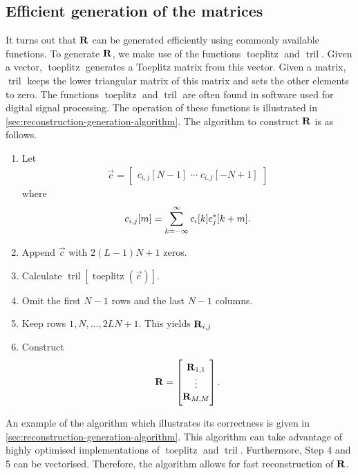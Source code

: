 \documentclass[a4paper, openany, oneside]{memoir}
\begin{document}
\subsection{Efficient generation of the matrices}
\label{sub:reconstruction-generation}
It turns out that $\boldsymbol{\mathbf{R}}$ can be generated efficiently using commonly available functions. To generate $\boldsymbol{\mathbf{R}}$, we make use of the functions $\operatorname{toeplitz}$ and $\operatorname{tril}$. Given a vector, $\operatorname{toeplitz}$ generates a Toeplitz matrix from this vector. Given a matrix, $\operatorname{tril}$ keeps the lower triangular matrix of this matrix and sets the other elements to zero. The functions $\operatorname{toeplitz}$ and $\operatorname{tril}$ are often found in software used for digital signal processing. The operation of these functions is illustrated in \cref{sec:reconstruction-generation-algorithm}. The algorithm to construct $\boldsymbol{\mathbf{R}}$ is as follows.

\begin{enumerate}[labelindent=0pt,labelwidth=\widthof{\ref{last-item2}},label=Step \arabic*:,itemindent=1em,leftmargin=!]
    \item Let \begin{align*}
                \vec{c} = \begin{bmatrix} c_{i,j}[N-1] \; \cdots \; c_{i,j}[-N+1] \end{bmatrix}
\end{align*} where \begin{align*}
                c_{i,j}[m] = \sum_{k=-\infty}^{\infty}c_i[k] c^*_j[k+m].
            \end{align*}
    \item Append $\vec{c}$ with $2(L-1)N+1$ zeros.
    \item Calculate $\operatorname{tril}[\operatorname{toeplitz}(\vec{c})]$.
    \item Omit the first $N-1$ rows and the last $N-1$ columns.
    \item Keep rows $1,N,\ldots,2LN+1$. This yields $\boldsymbol{\mathbf{R}}_{i,j}$
    \item Construct \begin{align*}
        \boldsymbol{\mathbf{R}} = \begin{bmatrix}
            \boldsymbol{\mathbf{R}}_{1,1} \\ \vdots \\ \boldsymbol{\mathbf{R}}_{M,M}
        \end{bmatrix}.
    \end{align*}
    \label{last-item2}
\end{enumerate}

An example of the algorithm which illustrates its correctness is given in \cref{sec:reconstruction-generation-algorithm}. This algorithm can take advantage of highly optimised implementations of $\operatorname{toeplitz}$ and $\operatorname{tril}$. Furthermore, Step 4 and 5 can be vectorised. Therefore, the algorithm allows for fast reconstruction of $\boldsymbol{\mathbf{R}}$.
\end{document}
